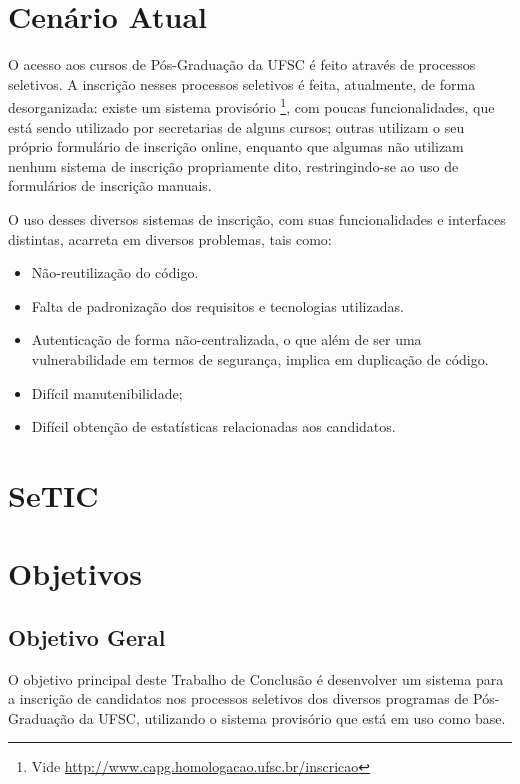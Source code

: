 \documentclass[
  10.5pt,				  %
	openright,			%
	twoside,			  %
  a5paper,
  chapter=TITLE,	%
	section=TITLE,	%
  hyphens,        %
	english,        %
	brazil          %
]{abntex2}
\begin{document}
\section{Cenário Atual}

O acesso aos cursos de Pós-Graduação da UFSC é feito através de processos seletivos. A inscrição nesses processos seletivos é feita, atualmente, de forma desorganizada: existe um sistema provisório \footnote{Vide \href{}{http://www.capg.homologacao.ufsc.br/inscricao} }, com poucas funcionalidades, que está sendo utilizado por secretarias de alguns cursos; outras utilizam o seu próprio formulário de inscrição online, enquanto que algumas não utilizam nenhum sistema de inscrição propriamente dito, restringindo-se ao uso de formulários de inscrição manuais.

O uso desses diversos sistemas de inscrição, com suas funcionalidades e interfaces distintas, acarreta em diversos problemas, tais como:

\begin{itemize}
  \item Não-reutilização do código.
  \item Falta de padronização dos requisitos e tecnologias utilizadas.
  \item Autenticação de forma não-centralizada, o que além de ser uma vulnerabilidade em termos de segurança, implica em duplicação de código.
  \item Difícil manutenibilidade;
  \item Difícil obtenção de estatísticas relacionadas aos candidatos.
\end{itemize}

\section{SeTIC}


\section{Objetivos}

\subsection{Objetivo Geral}
O objetivo principal deste Trabalho de Conclusão é desenvolver um sistema para a inscrição de candidatos nos processos seletivos dos diversos programas de Pós-Graduação da UFSC, utilizando o sistema provisório que está em uso como base.
\end{document}
